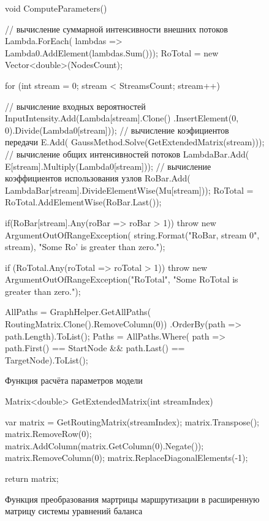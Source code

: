 \documentclass[oneside, draft, 14pt, a4paper]{extreport}
\begin{document}
\begin{figure}[h!]
    \begin{listing}{1}
void ComputeParameters()
{
  // вычисление суммарной интенсивности внешних потоков
  Lambda.ForEach(
	lambdas => Lambda0.AddElement(lambdas.Sum())); 
  RoTotal = new Vector<double>(NodesCount);

  for (int stream = 0; stream < StreamsCount; stream++)
  {
	// вычисление входных вероятностей
	InputIntensity.Add(Lambda[stream].Clone()
	  .InsertElement(0, 0).Divide(Lambda0[stream]));
	// вычисление коэфициентов передачи
	E.Add(
	  GaussMethod.Solve(GetExtendedMatrix(stream)));
	// вычисление общих интенсивностей потоков
	LambdaBar.Add(
	  E[stream].Multiply(Lambda0[stream]));
	// вычисление коэффициентов использования узлов
	RoBar.Add(
	  LambdaBar[stream].DivideElementWise(Mu[stream]));
	RoTotal = RoTotal.AddElementWise(RoBar.Last());
	
  	if(RoBar[stream].Any(roBar => roBar > 1))
	  throw new ArgumentOutOfRangeException(
	  string.Format("RoBar, stream {0}", stream),
	  "Some Ro' is greater than zero.");
  }
  if (RoTotal.Any(roTotal => roTotal > 1))
	throw new ArgumentOutOfRangeException("RoTotal",
	"Some RoTotal is greater than zero.");

  AllPaths =
	GraphHelper.GetAllPaths(
	RoutingMatrix.Clone().RemoveColumn(0))
	.OrderBy(path => path.Length).ToList();
	Paths = AllPaths.Where(
	path => path.First() == StartNode &&
	path.Last() == TargetNode).ToList();
}\end{listing}
	
	\caption{Функция расчёта параметров модели}
	\label{pic:function_computeParameters}
\end{figure}

\begin{figure}[h!]
    \begin{listing}{1}
Matrix<double> GetExtendedMatrix(int streamIndex)
{
  var matrix = GetRoutingMatrix(streamIndex);
  matrix.Transpose();
  matrix.RemoveRow(0);
  matrix.AddColumn(matrix.GetColumn(0).Negate());
  matrix.RemoveColumn(0);
  matrix.ReplaceDiagonalElements(-1);

  return matrix;
}\end{listing}
    
    \caption{Функция преобразования мартрицы маршрутизации в расширенную матрицу системы уравнений баланса}
    \label{pic:functions_getextendedmatrix}
\end{figure}
\end{document}
